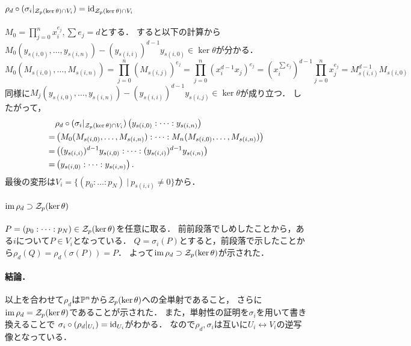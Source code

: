 \documentclass[a4paper]{jsarticle}
\begin{document}
    \paragraph{$\rho_d \circ (\sigma_i|_{\mathcal{Z}_p(\ker \theta) \cap V_i})=\mathrm{id}_{\mathcal{Z}_p(\ker \theta) \cap V_i}$}
    $M_0=\prod_{j=0}^{n}{x_i^{e_j}}, \sum{e_j}=d$とする．
    すると以下の計算から$M_0(y_{s(i,0)},\dots,y_{s(i,n)})-(y_{s(i,i)})^{d-1} y_{s(i,0)} \in \ker \theta$が分かる．
    \[
        M_0(M_{s(i,0)},\dots,M_{s(i,n)})
        =\prod_{j=0}^{n}{\left( M_{s(i,j)} \right)^{e_j}}
        =\prod_{j=0}^{n}{\left( x_i^{d-1} x_j \right)^{e_j}}
        =(x_i^{\sum{e_j}})^{d-1} \prod_{j=0}^{n}{x_j^{e_j}}
        =M_{s(i,i)}^{d-1} M_{s(i,0)}
    \]
    同様に$M_j(y_{s(i,0)},\dots,y_{s(i,n)})-(y_{s(i,i)})^{d-1} y_{s(i,j)} \in \ker \theta$が成り立つ．
    したがって，
    \begin{align*}
        {}&\rho_d \circ (\sigma_i|_{\mathcal{Z}_p(\ker \theta) \cap V_i})\left( y_{s(i,0)}:\dots:y_{s(i,n)} \right) \\
        =& \left( M_0(M_{s(i,0)},\dots,M_{s(i,n)}):\dots:M_n(M_{s(i,0)},\dots,M_{s(i,n)}) \right) \\
        =& \left( (y_{s(i,i)})^{d-1} y_{s(i,0)}:\dots:(y_{s(i,i)})^{d-1} y_{s(i,n)} \right) \\
        =& \left( y_{s(i,0)}:\dots:y_{s(i,n)} \right).
    \end{align*}
    最後の変形は$V_i=\{(p_0:\dots:p_N) ~|~ p_{s(i,i)} \neq 0\}$から．

    \paragraph{$\operatorname{im} \rho_d \supset \mathcal{Z}_p(\ker \theta)$}
    $P=(p_0:\dots:p_N) \in \mathcal{Z}_p(\ker \theta)$を任意に取る．
    前前段落でしめしたことから，ある$i$について$P \in V_i$となっている．
    $Q=\sigma_i(P)$とすると，前段落で示したことから$\rho_d(Q)=\rho_d(\sigma(P))=P$．
    よって$\operatorname{im} \rho_d \supset \mathcal{Z}_p(\ker \theta)$が示された．

    \paragraph{結論．}
    以上を合わせて$\rho_d$は$\mathbb{P}^n$から$\mathcal{Z}_p(\ker \theta)$への全単射であること，
    さらに$\operatorname{im} \rho_d=\mathcal{Z}_p(\ker \theta)$であることが示された．
    また，単射性の証明を$\sigma_i$を用いて書き換えることで
    $\sigma_i \circ (\rho_d|_{U_i})=\mathrm{id}_{U_i}$がわかる．
    なので$\rho_d, \sigma_i$は互いに$U_i \leftrightarrow V_i$の逆写像となっている．
\end{document}
